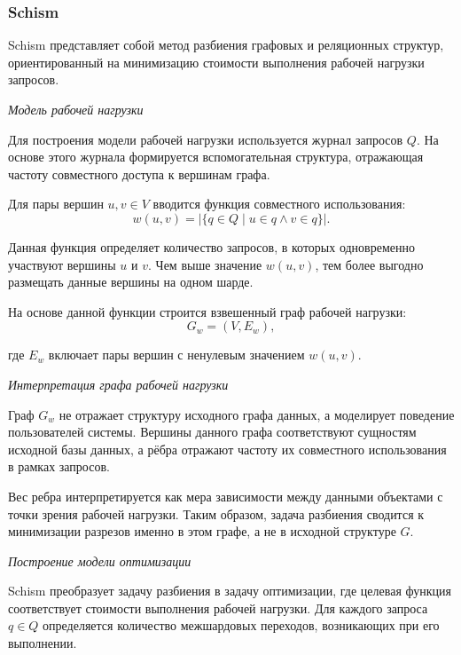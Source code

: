\subsubsection{Schism} \label{section:schism}

Schism \cite{schism} представляет собой метод разбиения графовых и реляционных структур, ориентированный на минимизацию стоимости выполнения рабочей нагрузки запросов.

\textit{Модель рабочей нагрузки}

Для построения модели рабочей нагрузки используется журнал запросов $Q$. На основе этого журнала формируется вспомогательная структура, отражающая частоту совместного доступа к вершинам графа.

Для пары вершин $u, v \in V$ вводится функция совместного использования:
\begin{equation*}
w(u, v) = |\{q \in Q \mid u \in q \land v \in q\}|.
\end{equation*}

Данная функция определяет количество запросов, в которых одновременно участвуют вершины $u$ и $v$. Чем выше значение $w(u, v)$, тем более выгодно размещать данные вершины на одном шарде.

На основе данной функции строится взвешенный граф рабочей нагрузки:
\begin{equation*}
G_w = (V, E_w),
\end{equation*}

где $E_w$ включает пары вершин с ненулевым значением $w(u, v)$.

\textit{Интерпретация графа рабочей нагрузки}

Граф $G_w$ не отражает структуру исходного графа данных, а моделирует поведение пользователей системы. Вершины данного графа соответствуют сущностям исходной базы данных, а рёбра отражают частоту их совместного использования в рамках запросов.

Вес ребра интерпретируется как мера зависимости между данными объектами с точки зрения рабочей нагрузки. Таким образом, задача разбиения сводится к минимизации разрезов именно в этом графе, а не в исходной структуре $G$.

\textit{Построение модели оптимизации}

Schism преобразует задачу разбиения в задачу оптимизации, где целевая функция соответствует стоимости выполнения рабочей нагрузки. Для каждого запроса $q \in Q$ определяется количество межшардовых переходов, возникающих при его выполнении.

